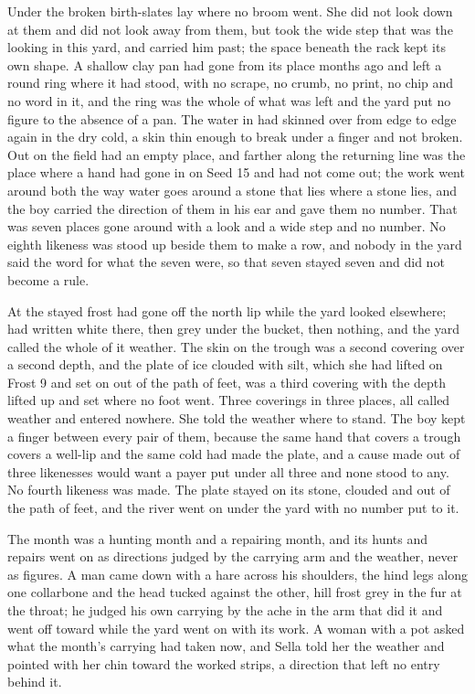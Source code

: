Under  the broken birth-slates lay where no broom went. She did not look down at them and did not look away from them, but took the wide step that was the looking in this yard, and carried him past; the space beneath the rack kept its own shape. A shallow clay pan had gone from its place months ago and left a round ring where it had stood, with no scrape, no crumb, no print, no chip and no word in it, and the ring was the whole of what was left and the yard put no figure to the absence of a pan. The water in  had skinned over from edge to edge again in the dry cold, a skin thin enough to break under a finger and not broken. Out on  the field had an empty place, and farther along the returning line was the place where a hand had gone in on Seed 15 and had not come out; the work went around both the way water goes around a stone that lies where a stone lies, and the boy carried the direction of them in his ear and gave them no number. That was seven places gone around with a look and a wide step and no number. No eighth likeness was stood up beside them to make a row, and nobody in the yard said the word for what the seven were, so that seven stayed seven and did not become a rule.

At  the stayed frost had gone off the north lip while the yard looked elsewhere;  had written white there, then grey under the bucket, then nothing, and the yard called the whole of it weather. The skin on the trough was a second covering over a second depth, and the plate of ice clouded with silt, which she had lifted on Frost 9 and set on  out of the path of feet, was a third covering with the depth lifted up and set where no foot went. Three coverings in three places, all called weather and entered nowhere. She told the weather where to stand. The boy kept a finger between every pair of them, because the same hand that covers a trough covers a well-lip and the same cold had made the plate, and a cause made out of three likenesses would want a payer put under all three and none stood to any. No fourth likeness was made. The plate stayed on its stone, clouded and out of the path of feet, and the river went on under the yard with no number put to it.

\scenebreak

The month was a hunting month and a repairing month, and its hunts and repairs went on as directions judged by the carrying arm and the weather, never as figures. A man came down  with a hare across his shoulders, the hind legs along one collarbone and the head tucked against the other, hill frost grey in the fur at the throat; he judged his own carrying by the ache in the arm that did it and went off toward  while the yard went on with its work. A woman with a pot asked what the month's carrying had taken now, and Sella told her the weather and pointed with her chin toward the worked strips, a direction that left no entry behind it.

